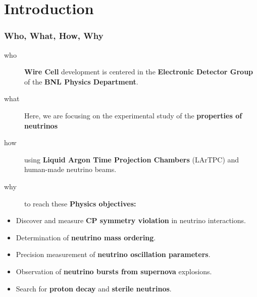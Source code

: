 \documentclass[xcolor=dvipsnames]{beamer}
\begin{document}




\section {Introduction}

\begin{frame}
  \frametitle{Who, What, How, Why}

  \begin{description}
  \item[who] \textbf{Wire Cell} development is centered in the
    \textbf{Electronic Detector Group} of the \textbf{BNL Physics
      Department}.
  \item[what] Here, we are focusing on the experimental study of the \textbf{properties of
    neutrinos}
  \item[how] using \textbf{Liquid Argon Time
      Projection Chambers} (LArTPC) and human-made neutrino beams.
  \item[why] to reach these \textbf{Physics objectives:}
  \end{description}
  \begin{itemize}
  \item Discover and measure \textbf{CP symmetry violation} in neutrino interactions.
  \item Determination of \textbf{neutrino mass ordering}.
  \item Precision measurement of \textbf{neutrino oscillation parameters}.
  \item Observation of \textbf{neutrino bursts from supernova} explosions.
  \item Search for \textbf{proton decay} and \textbf{sterile neutrinos}.
  \end{itemize}
\end{frame}
\end{document}
